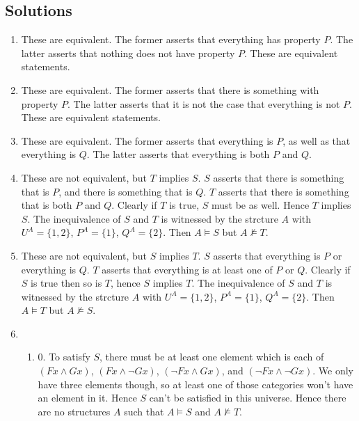 \newpage
\begin{mdframed}[linewidth=1]
\section*{Solutions}
\begin{enumerate}
    \item These are equivalent. The former asserts that everything has property $P$. The latter asserts that nothing does not have property $P$. These are equivalent statements. 

    \item These are equivalent. The former asserts that there is something with property $P$. The latter asserts that it is not the case that everything is not $P$. These are equivalent statements. 

    \item These are equivalent. The former asserts that everything is $P$, as well as that everything is $Q$. The latter asserts that everything is both $P$ and $Q$.

    \item These are not equivalent, but $T$ implies $S$. $S$ asserts that there is something that is $P$, and there is something that is $Q$. $T$ asserts that there is something that is both $P$ and $Q$. Clearly if $T$ is true, $S$ must be as well. Hence $T$ implies $S$. The inequivalence of $S$ and $T$ is witnessed by the strcture $A$ with $U^A = \{1, 2\}$, $P^A = \{1\}$, $Q^A = \{2\}$. Then $A \models S$ but $A \not \models T$. 

    \item These are not equivalent, but $S$ implies $T$. $S$ asserts that everything is $P$ or everything is $Q$. $T$ asserts that everything is at least one of $P$ or $Q$. Clearly if $S$ is true then so is $T$, hence $S$ implies $T$. The inequivalence of $S$ and $T$ is witnessed by the strcture $A$ with $U^A = \{1, 2\}$, $P^A = \{1\}$, $Q^A = \{2\}$. Then $A \models T$ but $A \not \models S$. 

    \item 
    \begin{enumerate}
        \item 0. To satisfy $S$, there must be at least one element which is each of $(Fx \land Gx)$, $(Fx \land \lnot Gx)$, $(\lnot Fx \land Gx)$, and $(\lnot Fx \land \lnot Gx)$. We only have three elements though, so at least one of those categories won't have an element in it. Hence $S$ can't be satisfied in this universe. Hence there are no structures $A$ such that $A \models S$ and $A \not \models T$. 


\end{enumerate}
\end{enumerate}
\end{mdframed}
